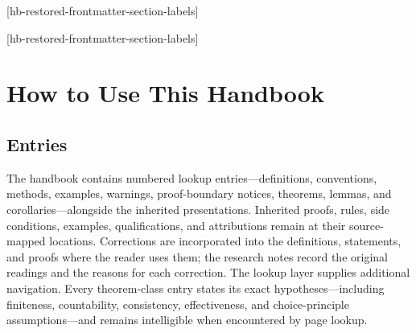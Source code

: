 








\setcounter{hbrestoredfrontmattersection}{0}
[hb-restored-frontmatter-section-labels]{%
  \ifcase\value{hbrestoredfrontmattersection}\or
    \label{sec:inherited-prerequisites}%
  \or
    \label{sec:inherited-learning-outcomes}%
  \fi}

[hb-restored-frontmatter-section-labels]

\chapter*{How to Use This Handbook}

\section*{Entries}

The handbook contains numbered lookup entries---definitions, conventions,
methods, examples, warnings, proof-boundary notices, theorems, lemmas, and
corollaries---alongside the inherited presentations.  Inherited proofs, rules,
side conditions, examples, qualifications, and attributions remain at their
source-mapped locations.  Corrections are incorporated into the definitions,
statements, and proofs where the reader uses them; the research notes record
the original readings and the reasons for each correction.
The lookup layer supplies additional navigation.
Every theorem-class entry states its exact
hypotheses---including finiteness, countability, consistency, effectiveness,
and choice-principle assumptions---and remains intelligible when
encountered by page lookup.

